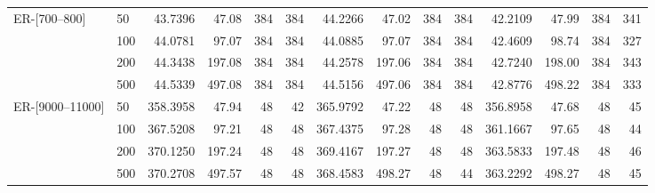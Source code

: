 \begin{table}[t]
{\begin{tabular}{llrrrrrrrrrrrr}
\midrule
ER-[700--800] & 50 & 43.7396 & 47.08 & 384 & 384 & 44.2266 & 47.02 & 384 & 384 & 42.2109 & 47.99 & 384 & 341 \\
 & 100 & 44.0781 & 97.07 & 384 & 384 & 44.0885 & 97.07 & 384 & 384 & 42.4609 & 98.74 & 384 & 327 \\
\rowcolor{TableGold}
 & 200 & 44.3438 & 197.08 & 384 & 384 & 44.2578 & 197.06 & 384 & 384 & 42.7240 & 198.00 & 384 & 343 \\
 & 500 & 44.5339 & 497.08 & 384 & 384 & 44.5156 & 497.06 & 384 & 384 & 42.8776 & 498.22 & 384 & 333 \\
\midrule
ER-[9000--11000] & 50 & 358.3958 & 47.94 & 48 & 42 & 365.9792 & 47.22 & 48 & 48 & 356.8958 & 47.68 & 48 & 45 \\
 & 100 & 367.5208 & 97.21 & 48 & 48 & 367.4375 & 97.28 & 48 & 48 & 361.1667 & 97.65 & 48 & 44 \\
\rowcolor{TableGold}
 & 200 & 370.1250 & 197.24 & 48 & 48 & 369.4167 & 197.27 & 48 & 48 & 363.5833 & 197.48 & 48 & 46 \\
 & 500 & 370.2708 & 497.57 & 48 & 48 & 368.4583 & 498.27 & 48 & 44 & 363.2292 & 498.27 & 48 & 45 \\
\bottomrule
\end{tabular}}
\end{table}
